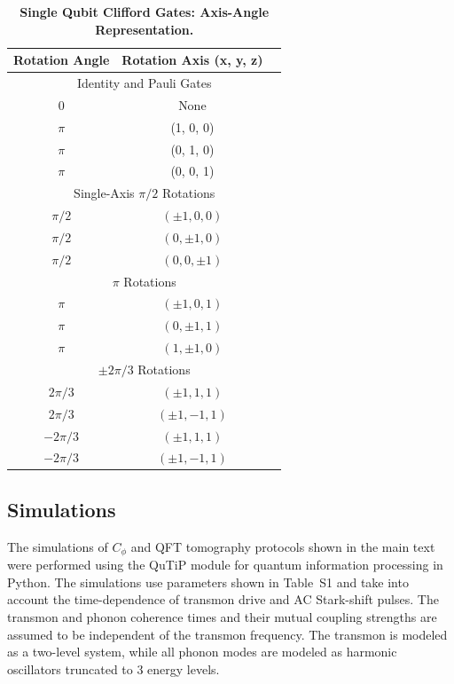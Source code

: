 \documentclass[12pt]{article}
\begin{document}
\begin{table}[h!]
\centering
\caption{\textbf{Single Qubit Clifford Gates: Axis-Angle Representation.}}
\begin{tabular}{ccc}
\toprule
\textbf{Rotation Angle} & \textbf{Rotation Axis (x, y, z)} \\
\midrule
\multicolumn{3}{c}{Identity and Pauli Gates} \\
\midrule
0     & None         \\
$\pi$ & (1, 0, 0)     \\
$\pi$ & (0, 1, 0)     \\
$\pi$ & (0, 0, 1)      \\
\midrule
\multicolumn{3}{c}{Single-Axis $\pi/2$ Rotations} \\
\midrule
$\pi/2$ & $(\pm1, 0, 0)$    \\
$\pi/2$ & $(0, \pm1, 0)$    \\
$\pi/2$ & $(0, 0, \pm1)$    \\
\midrule
\multicolumn{3}{c}{$\pi$ Rotations} \\
\midrule
$\pi$ & $(\pm1, 0, 1)$    \\
$\pi$ & $(0, \pm1, 1)$    \\
$\pi$ & $(1, \pm1, 0)$    \\
\midrule
\multicolumn{3}{c}{$\pm 2\pi/3$ Rotations} \\
\midrule
$2\pi/3$  & $(\pm1, 1, 1)$   \\
$2\pi/3$  & $(\pm1, -1, 1)$  \\
$-2\pi/3$ & $(\pm1, 1, 1)$   \\
$-2\pi/3$ & $(\pm1, -1, 1)$  \\
\bottomrule
\end{tabular}
\label{gateset}
\end{table}

\subsection{Simulations}

The simulations of $C_{\phi}$ and QFT tomography protocols shown in the main text were performed using the QuTiP module for quantum information processing in Python\cite{Li2022pulselevelnoisy}. The simulations use parameters shown in Table~S1 and take into account the time-dependence of transmon drive and AC Stark-shift pulses. The transmon and phonon coherence times and their mutual coupling strengths are assumed to be independent of the transmon frequency. The transmon is modeled as a two-level system, while all phonon modes are modeled as harmonic oscillators truncated to 3 energy levels.
\end{document}
